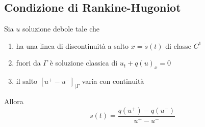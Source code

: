 \documentclass[10pt,a4paper,twoside,openright]{book}
\begin{document}
\subsection{Condizione di Rankine-Hugoniot}
\begin{theorem}
	Sia $u$ soluzione debole tale che
	\begin{enumerate}
		\item ha una linea di discontinuità a salto $x=\dot{s}( t)$ di classe $C^{1}$
		\item fuori da $\Gamma $ è soluzione classica di $u_{t} +q( u)_{x} =0$
		\item il salto $\left[ u^{+} -u^{-}\right]_{|\Gamma }$ varia con continuità
	\end{enumerate}

	Allora
	\begin{equation}
		\dot{s}( t) =\frac{q\left( u^{+}\right) -q\left( u^{-}\right)}{u^{+} -u^{-}}
	\end{equation}
\end{theorem}
\end{document}
